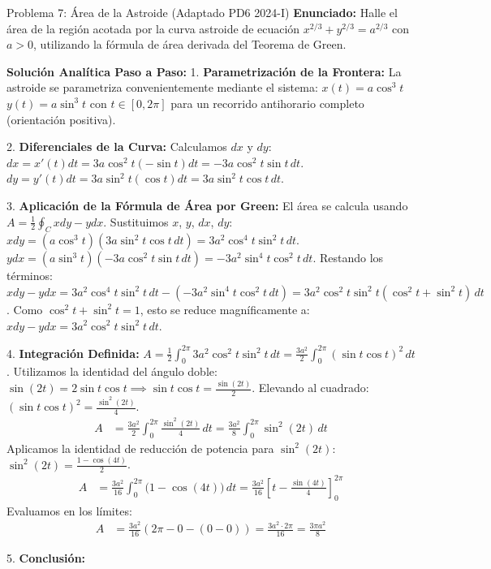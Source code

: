 \documentclass[11pt,a4paper]{article}
\begin{document}
\begin{ejerciciobox}{Problema 7: Área de la Astroide (Adaptado PD6 2024-I)}
\textbf{Enunciado:}
Halle el área de la región acotada por la curva astroide de ecuación $x^{2/3} + y^{2/3} = a^{2/3}$ con $a > 0$, utilizando la fórmula de área derivada del Teorema de Green.

\textbf{Solución Analítica Paso a Paso:}
1. \textbf{Parametrización de la Frontera:}
La astroide se parametriza convenientemente mediante el sistema:
$x(t) = a \cos^3 t$
$y(t) = a \sin^3 t$
con $t \in [0, 2\pi]$ para un recorrido antihorario completo (orientación positiva).

2. \textbf{Diferenciales de la Curva:}
Calculamos $dx$ y $dy$:
$dx = x'(t)dt = 3a \cos^2 t (-\sin t) dt = -3a \cos^2 t \sin t \, dt$.
$dy = y'(t)dt = 3a \sin^2 t (\cos t) dt = 3a \sin^2 t \cos t \, dt$.

3. \textbf{Aplicación de la Fórmula de Área por Green:}
El área se calcula usando $A = \frac{1}{2}\oint_C x dy - y dx$.
Sustituimos $x$, $y$, $dx$, $dy$:
$x dy = (a \cos^3 t) (3a \sin^2 t \cos t \, dt) = 3a^2 \cos^4 t \sin^2 t \, dt$.
$y dx = (a \sin^3 t) (-3a \cos^2 t \sin t \, dt) = -3a^2 \sin^4 t \cos^2 t \, dt$.
Restando los términos:
$x dy - y dx = 3a^2 \cos^4 t \sin^2 t \, dt - (-3a^2 \sin^4 t \cos^2 t \, dt) = 3a^2 \cos^2 t \sin^2 t (\cos^2 t + \sin^2 t) \, dt$.
Como $\cos^2 t + \sin^2 t = 1$, esto se reduce magníficamente a:
$x dy - y dx = 3a^2 \cos^2 t \sin^2 t \, dt$.

4. \textbf{Integración Definida:}
$A = \frac{1}{2} \int_0^{2\pi} 3a^2 \cos^2 t \sin^2 t \, dt = \frac{3a^2}{2} \int_0^{2\pi} (\sin t \cos t)^2 \, dt$.
Utilizamos la identidad del ángulo doble: $\sin(2t) = 2\sin t \cos t \implies \sin t \cos t = \frac{\sin(2t)}{2}$.
Elevando al cuadrado: $(\sin t \cos t)^2 = \frac{\sin^2(2t)}{4}$.
\begin{align*}
A &= \frac{3a^2}{2} \int_0^{2\pi} \frac{\sin^2(2t)}{4} \, dt = \frac{3a^2}{8} \int_0^{2\pi} \sin^2(2t) \, dt
\end{align*}
Aplicamos la identidad de reducción de potencia para $\sin^2(2t)$: $\sin^2(2t) = \frac{1 - \cos(4t)}{2}$.
\begin{align*}
A &= \frac{3a^2}{16} \int_0^{2\pi} \big( 1 - \cos(4t) \big) \, dt = \frac{3a^2}{16} \left[ t - \frac{\sin(4t)}{4} \right]_0^{2\pi}
\end{align*}
Evaluamos en los límites:
\begin{align*}
A &= \frac{3a^2}{16} \left( 2\pi - 0 - (0 - 0) \right) = \frac{3a^2 \cdot 2\pi}{16} = \frac{3\pi a^2}{8}
\end{align*}

5. \textbf{Conclusión:}
\end{ejerciciobox}
\end{document}
